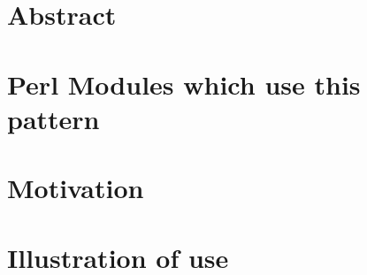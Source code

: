 
	\section{Abstract}


	\section{Perl Modules which use this pattern}

	\section{Motivation}

	\section{Illustration of use}
